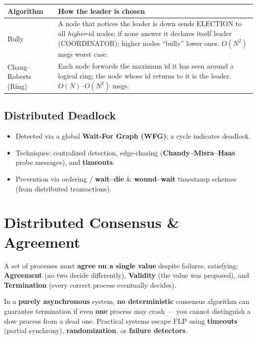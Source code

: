 \documentclass[11pt,a4paper]{article}
\begin{document}
\begin{longtable}{@{}p{3.4cm}p{10.4cm}@{}}
\toprule
\rowcolor{primary!15}
\textbf{Algorithm} & \textbf{How the leader is chosen} \\
\midrule
\endhead
Bully & A node that notices the leader is down sends ELECTION to all \emph{higher}-id nodes; if none answer it declares itself leader (COORDINATOR); higher nodes ``bully'' lower ones. $O(N^2)$ msgs worst case. \\
Chang--Roberts (Ring) & Each node forwards the maximum id it has seen around a logical ring; the node whose id returns to it is the leader. $O(N)$--$O(N^2)$ msgs. \\
\bottomrule
\end{longtable}

\subsection{Distributed Deadlock}
\begin{itemize}[leftmargin=*, itemsep=2pt]
  \item Detected via a global \textbf{Wait-For Graph (WFG)}; a cycle indicates deadlock.
  \item Techniques: centralized detection, edge-chasing (\textbf{Chandy--Misra--Haas} probe messages), and \textbf{timeouts}.
  \item Prevention via ordering / \textbf{wait--die} \& \textbf{wound--wait} timestamp schemes (from distributed transactions).
\end{itemize}

\section{Distributed Consensus \& Agreement}

\begin{definitionbox}
A set of processes must \textbf{agree on a single value} despite failures, satisfying: \textbf{Agreement} (no two decide differently), \textbf{Validity} (the value was proposed), and \textbf{Termination} (every correct process eventually decides).
\end{definitionbox}

\begin{alertbox}
In a \textbf{purely asynchronous} system, \textbf{no deterministic} consensus algorithm can guarantee termination if even \textbf{one} process may crash --- you cannot distinguish a slow process from a dead one. Practical systems escape FLP using \textbf{timeouts} (partial synchrony), \textbf{randomization}, or \textbf{failure detectors}.
\end{alertbox}
\end{document}
